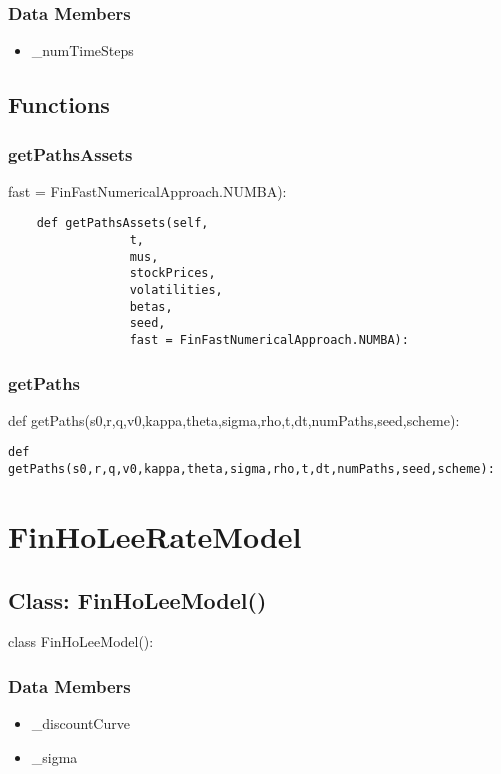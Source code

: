 \documentclass[twoside,11pt]{book}
\begin{document}
\subsubsection*{Data Members}
\begin{itemize}
\item{\_numTimeSteps}
\end{itemize}

\subsection*{Functions}

\subsubsection*{{\bf getPathsAssets}}
fast = FinFastNumericalApproach.NUMBA): 

\begin{lstlisting}
    def getPathsAssets(self, 
                 t,
                 mus,
                 stockPrices,
                 volatilities,
                 betas,
                 seed, 
                 fast = FinFastNumericalApproach.NUMBA):
\end{lstlisting}

\subsubsection*{{\bf getPaths}}
def getPaths(s0,r,q,v0,kappa,theta,sigma,rho,t,dt,numPaths,seed,scheme): 

\begin{lstlisting}
def getPaths(s0,r,q,v0,kappa,theta,sigma,rho,t,dt,numPaths,seed,scheme):
\end{lstlisting}

\newpage
\section{FinHoLeeRateModel}

\subsection*{Class: FinHoLeeModel()}
class FinHoLeeModel(): 

\subsubsection*{Data Members}
\begin{itemize}
\item{\_discountCurve}
\item{\_sigma}
\end{itemize}
\end{document}
